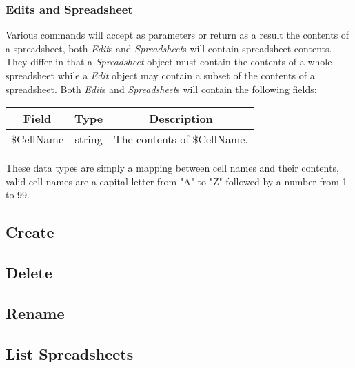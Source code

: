 \subsubsection{Edits and Spreadsheet}
\label{sec:message:edits}
\label{sec:message:spreadsheet}

Various commands will accept as parameters or return as a result the contents of a spreadsheet,
both \emph{Edit}s and \emph{Spreadsheet}s will contain spreadsheet contents. They differ in that
a \emph{Spreadsheet} object must contain the contents of a whole spreadsheet while a \emph{Edit}
object may contain a subset of the contents of a spreadsheet. Both \emph{Edit}s and \emph{Spreadsheet}s
will contain the following fields:

\begin{table}[H]
    \begin{center}
        \begin{tabular}{|c|c|c|}\hline
            Field & Type & Description \\\hline
            \$CellName & string & The contents of \$CellName. \\\hline
        \end{tabular}
    \end{center}
\end{table}

These data types are simply a mapping between cell names and their contents, valid cell names are a
capital letter from "A" to "Z" followed by a number from 1 to 99.

\subsection{Create}
\label{sec:message:create}


\subsection{Delete}
\label{sec:message:delete}


\subsection{Rename}
\label{sec:message:rename}


\subsection{List Spreadsheets}
\label{sec:message:list}



